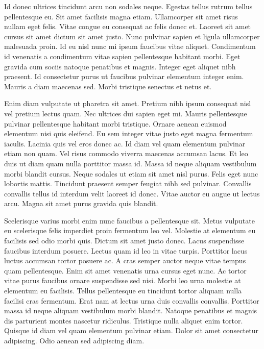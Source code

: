 \documentclass[11pt]{isr} %
\begin{document}
Id donec ultrices tincidunt arcu non sodales neque. Egestas tellus rutrum tellus pellentesque eu. Sit amet facilisis magna etiam. Ullamcorper sit amet risus nullam eget felis. Vitae congue eu consequat ac felis donec et. Laoreet sit amet cursus sit amet dictum sit amet justo. Nunc pulvinar sapien et ligula ullamcorper malesuada proin. Id eu nisl nunc mi ipsum faucibus vitae aliquet. Condimentum id venenatis a condimentum vitae sapien pellentesque habitant morbi. Eget gravida cum sociis natoque penatibus et magnis. Integer eget aliquet nibh praesent. Id consectetur purus ut faucibus pulvinar elementum integer enim. Mauris a diam maecenas sed. Morbi tristique senectus et netus et.

Enim diam vulputate ut pharetra sit amet. Pretium nibh ipsum consequat nisl vel pretium lectus quam. Nec ultrices dui sapien eget mi. Mauris pellentesque pulvinar pellentesque habitant morbi tristique. Ornare aenean euismod elementum nisi quis eleifend. Eu sem integer vitae justo eget magna fermentum iaculis. Lacinia quis vel eros donec ac. Id diam vel quam elementum pulvinar etiam non quam. Vel risus commodo viverra maecenas accumsan lacus. Et leo duis ut diam quam nulla porttitor massa id. Massa id neque aliquam vestibulum morbi blandit cursus. Neque sodales ut etiam sit amet nisl purus. Felis eget nunc lobortis mattis. Tincidunt praesent semper feugiat nibh sed pulvinar. Convallis convallis tellus id interdum velit laoreet id donec. Vitae auctor eu augue ut lectus arcu. Magna sit amet purus gravida quis blandit.

Scelerisque varius morbi enim nunc faucibus a pellentesque sit. Metus vulputate eu scelerisque felis imperdiet proin fermentum leo vel. Molestie at elementum eu facilisis sed odio morbi quis. Dictum sit amet justo donec. Lacus suspendisse faucibus interdum posuere. Lectus quam id leo in vitae turpis. Porttitor lacus luctus accumsan tortor posuere ac. A cras semper auctor neque vitae tempus quam pellentesque. Enim sit amet venenatis urna cursus eget nunc. Ac tortor vitae purus faucibus ornare suspendisse sed nisi. Morbi leo urna molestie at elementum eu facilisis. Tellus pellentesque eu tincidunt tortor aliquam nulla facilisi cras fermentum. Erat nam at lectus urna duis convallis convallis. Porttitor massa id neque aliquam vestibulum morbi blandit. Natoque penatibus et magnis dis parturient montes nascetur ridiculus. Tristique nulla aliquet enim tortor. Quisque id diam vel quam elementum pulvinar etiam. Dolor sit amet consectetur adipiscing. Odio aenean sed adipiscing diam.
\end{document}
